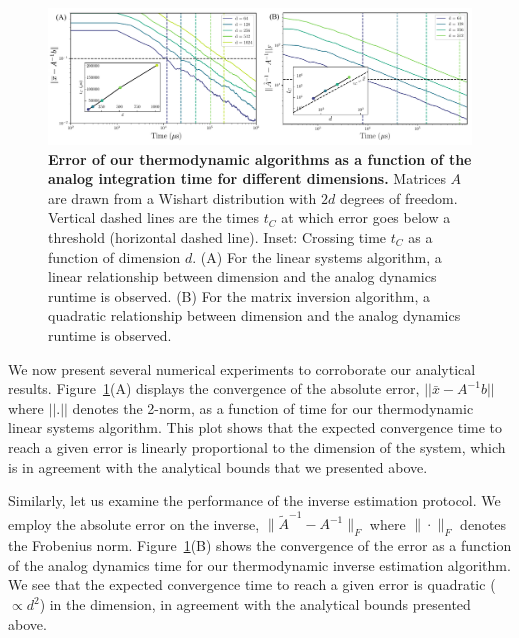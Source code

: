 \documentclass[prx,onecolumn,floatfix,longbibliography,notitlepage, nofootinbib]{revtex4-1}
\begin{document}
\begin{figure}[t]
    \centering
    \includegraphics[width=0.98\linewidth]{figures/TLA_times.pdf}
    \caption{\textbf{Error of our thermodynamic algorithms as a function of the analog integration time for different dimensions.} Matrices $A$ are drawn from a Wishart distribution with $2d$ degrees of freedom. Vertical dashed lines are the times $t_C$ at which error goes below a threshold (horizontal dashed line). Inset: Crossing time $t_C$ as a function of dimension $d$. (A) For the linear systems algorithm, a linear relationship between dimension and the analog dynamics runtime is observed.
    (B) For the matrix inversion algorithm, a quadratic relationship between dimension and the analog dynamics runtime is observed.}
    \label{fig:ErrorVsAnalogTime}
\end{figure}



We now present several numerical experiments to corroborate our analytical results. Figure~\ref{fig:ErrorVsAnalogTime}(A) displays the convergence of the absolute error, $||\bar{x} - A^{-1}b||$ where $||.||$ denotes the 2-norm, as a function of time for our thermodynamic linear systems algorithm. This plot shows that the expected convergence time to reach a given error is linearly proportional to the dimension of the system, which is in agreement with the analytical bounds that we presented above.

Similarly, let us examine the performance of the inverse estimation protocol. We employ the absolute error on the inverse, $ \|\tilde{A}^{-1} - A^{-1}\|_F$ where $\|\cdot\|_F$ denotes the Frobenius norm. Figure~\ref{fig:ErrorVsAnalogTime}(B) shows the convergence of the error as a function of the analog dynamics time for our thermodynamic inverse estimation algorithm. We see that the expected convergence time to reach a given error is quadratic ($\propto d^2$) in the dimension, in agreement with the analytical bounds presented above.
\end{document}
